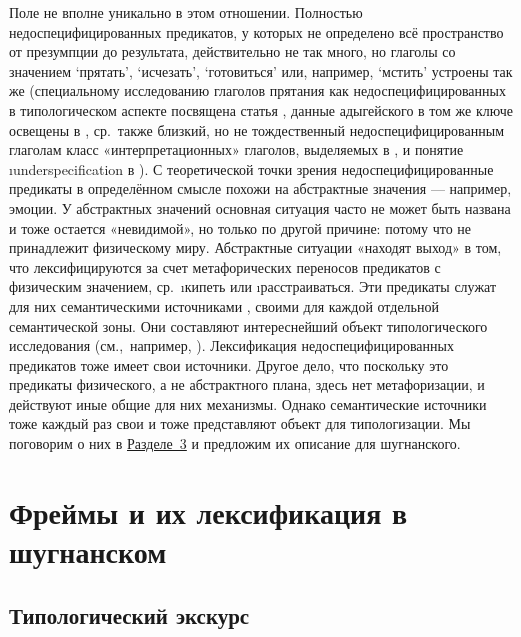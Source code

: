 Поле  не вполне уникально в этом отношении. Полностью недоспецифицированных предикатов, у которых не определено всё пространство от презумпции до результата, действительно не так много, но глаголы со значением ‘прятать’, ‘исчезать’, ‘готовиться’ или, например, ‘мстить’ устроены так же (специальному исследованию глаголов прятания как недоспецифицированных в типологическом аспекте посвящена статья \parencite{reznikova2022}, данные адыгейского в том же ключе освещены в \parencite{bagirokova_ryzhova2022}, ср.~также близкий, но не тождественный недоспецифицированным глаголам класс «интерпретационных» глаголов, выделяемых в \parencite{apresjan2004}, и понятие \i{underspecification} в \parencite{geeraerts2016}). С теоретической точки зрения недоспецифицированные предикаты в определённом смысле похожи на абстрактные значения — например, эмоции. У абстрактных значений основная ситуация часто не может быть названа и тоже остается «невидимой», но только по другой причине: потому что не принадлежит физическому миру. Абстрактные ситуации «находят выход» в том, что лексифицируются за счет метафорических переносов предикатов с физическим значением, ср.~\i{кипеть} или \i{расстраиваться}. Эти предикаты служат для них семантическими источниками \parencite{koevecses2000}, своими для каждой отдельной семантической зоны. Они составляют интереснейший объект типологического исследования (см.,~например, \parencite{apresjan1997}). Лексификация недоспецифицированных предикатов тоже имеет свои источники. Другое дело, что поскольку это предикаты физического, а не абстрактного плана, здесь нет метафоризации, и действуют иные общие для них механизмы. Однако семантические источники тоже каждый раз свои и тоже представляют объект для типологизации. Мы поговорим о них в \hyperref[search-frames]{Разделе~3} и предложим их описание для шугнанского.

\section{Фреймы  и их лексификация в шугнанском} \label{search-frames}

\subsection{Типологический экскурс}

